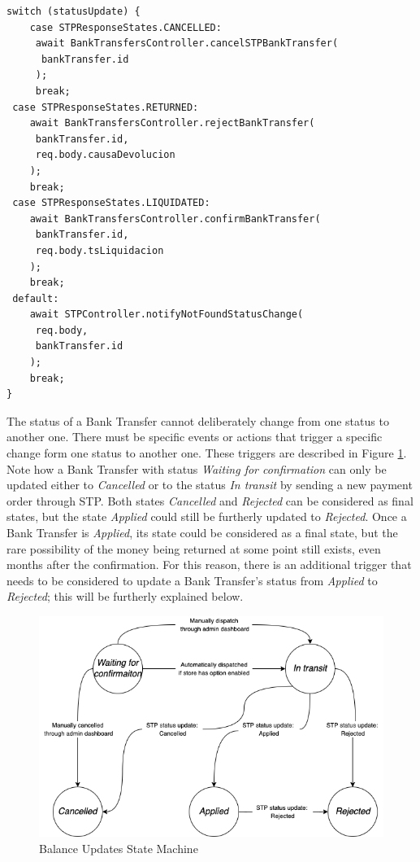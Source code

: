 \begin{verbatim}
switch (statusUpdate) {
    case STPResponseStates.CANCELLED:
     await BankTransfersController.cancelSTPBankTransfer(
      bankTransfer.id
     );
     break;
 case STPResponseStates.RETURNED:
    await BankTransfersController.rejectBankTransfer(
     bankTransfer.id,
     req.body.causaDevolucion
    );
    break;
 case STPResponseStates.LIQUIDATED:
    await BankTransfersController.confirmBankTransfer(
     bankTransfer.id,
     req.body.tsLiquidacion
    );
    break;
 default:
    await STPController.notifyNotFoundStatusChange(
     req.body,
     bankTransfer.id
    );
    break;
}

\end{verbatim}

The status of a Bank Transfer cannot deliberately change from one status to another one. There must be specific events or actions that trigger a specific change form one status to another one. These triggers are described in Figure \ref{fig:state_machine_bank_transfers}. Note how a Bank Transfer with status \textit{Waiting for confirmation} can only be updated either to \textit{Cancelled} or to the status \textit{In transit} by sending a new payment order through STP. Both states \textit{Cancelled} and \textit{Rejected} can be considered as final states, but the state \textit{Applied} could still be furtherly updated to \textit{Rejected}. Once a Bank Transfer is \textit{Applied}, its state could be considered as a final state, but the rare possibility of the money being returned at some point still exists, even months after the confirmation. For this reason, there is an additional trigger that needs to be considered to update a Bank Transfer’s status from \textit{Applied} to \textit{Rejected}; this will be furtherly explained below.

\begin{figure}[H]
    \centering
    \includegraphics[scale = 0.5]{assets/diagrams/BankTransfersStateMachine.png}
    \caption{Balance Updates State Machine}\label{fig:state_machine_bank_transfers}
\end{figure}

